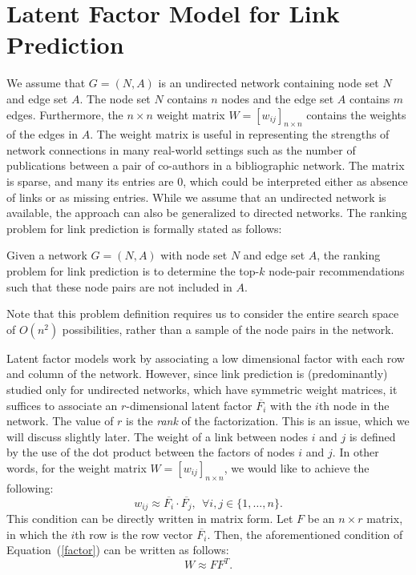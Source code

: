 \section{Latent Factor Model for Link Prediction}
\label{sec-NMF}

We assume that $G=(N, A)$ is an undirected network containing node set $N$ and
edge set $A$. The node set $N$ contains $n$ nodes and the edge set
$A$ contains $m$ edges. Furthermore, the $n \times n$ weight matrix
$W= [w_{ij}]_{n\times n}$ contains the weights of the edges in $A$.
The weight matrix is useful in representing the strengths of network
connections in  many real-world settings such as the number of
publications between a pair of co-authors in a bibliographic
network.  The matrix is sparse, and many its entries are 0, which could be
interpreted either as absence of links or as missing entries. While
we assume that an undirected network is available, the approach can
also be generalized to directed networks. The ranking problem for
link prediction is formally stated as follows:
\begin{definition}
Given a network $G=(N, A)$ with node set $N$ and edge set $A$, the ranking problem for link
prediction is to determine the top-$k$ node-pair recommendations such that these node pairs are not included in $A$.
\end{definition}
Note that this problem definition requires us to consider the entire
search space of $O(n^2)$ possibilities, rather than a sample of the
node pairs in the network.

Latent factor models work by associating a low dimensional factor
with each row and column of the network. However, since link
prediction is (predominantly) studied only for undirected networks,
which have symmetric weight matrices, it suffices to associate an
$r$-dimensional latent factor $\overline{F_i}$ with the $i$th node
in the network. The value of $r$ is the {\em rank} of the
factorization. This is an issue, which we will discuss slightly
later.  The weight of a link between nodes $i$ and $j$ is defined by
the use of the dot product between the factors of nodes $i$ and $j$.
In other words, for the weight matrix $W= [w_{ij}]_{n\times n}$, we
would like to achieve the following:
\begin{equation}
w_{ij} \approx \overline{F_i} \cdot \overline{F_j}, \ \ \forall i, j
\in \{ 1, \ldots, n \} \label{factor}.
\end{equation}
This condition can be directly written in matrix form. Let $F$ be an
$n \times r$ matrix, in which the $i$th row is the row vector
$\overline{F_i}$. Then, the aforementioned condition of
Equation~(\ref{factor}) can be written as follows:
\begin{equation}
W \approx F F^T.
\end{equation}


